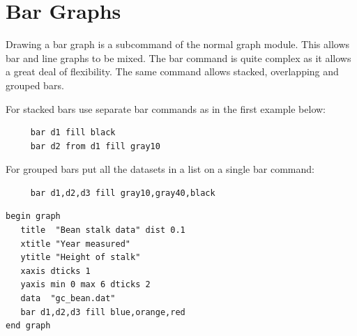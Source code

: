 \begin{commanddescription}
\end{commanddescription}

\section{Bar Graphs}
\label{cmd:bar}
Drawing a bar graph is a subcommand of the normal graph module. This allows
bar and line graphs to be mixed.
The bar command is quite complex as it allows a
great deal of flexibility.  The same command allows stacked, overlapping and
grouped bars.

For stacked bars use separate bar commands as in the first
example below:

\preglecode{}
\begin{Verbatim}
     bar d1 fill black
     bar d2 from d1 fill gray10
\end{Verbatim}
\postglecode{}

For grouped bars put all the datasets in a list on a single bar
command:

\preglecode{}
\begin{Verbatim}
     bar d1,d2,d3 fill gray10,gray40,black
\end{Verbatim}
\postglecode{}

\begin{minipage}[c]{8cm}
\begin{Verbatim}
begin graph
   title  "Bean stalk data" dist 0.1
   xtitle "Year measured"
   ytitle "Height of stalk"
   xaxis dticks 1
   yaxis min 0 max 6 dticks 2
   data  "gc_bean.dat"
   bar d1,d2,d3 fill blue,orange,red
end graph
\end{Verbatim}
\end{minipage}
\hfill
\begin{minipage}[c]{7cm}
\mbox{}
\end{minipage}

